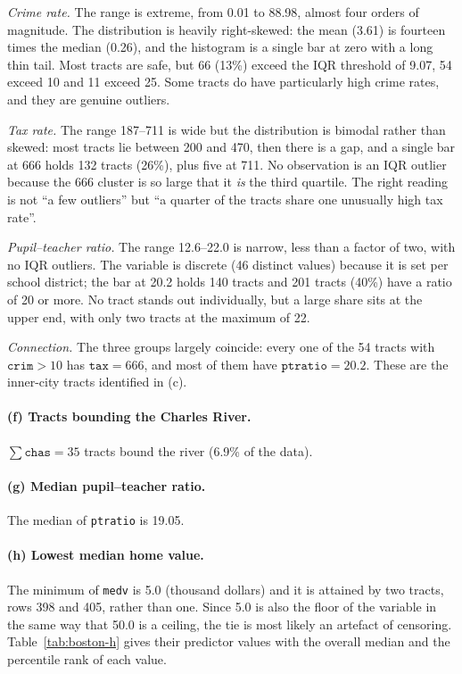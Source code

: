 \documentclass[11pt]{article}
\begin{document}
\emph{Crime rate.} The range is extreme, from 0.01 to 88.98, almost four orders of magnitude. The distribution is heavily right-skewed: the mean (3.61) is fourteen times the median (0.26), and the histogram is a single bar at zero with a long thin tail. Most tracts are safe, but 66 (13\%) exceed the IQR threshold of 9.07, 54 exceed 10 and 11 exceed 25. Some tracts do have particularly high crime rates, and they are genuine outliers.

\emph{Tax rate.} The range 187--711 is wide but the distribution is bimodal rather than skewed: most tracts lie between 200 and 470, then there is a gap, and a single bar at 666 holds 132 tracts (26\%), plus five at 711. No observation is an IQR outlier because the 666 cluster is so large that it \emph{is} the third quartile. The right reading is not ``a few outliers'' but ``a quarter of the tracts share one unusually high tax rate''.

\emph{Pupil--teacher ratio.} The range 12.6--22.0 is narrow, less than a factor of two, with no IQR outliers. The variable is discrete (46 distinct values) because it is set per school district; the bar at 20.2 holds 140 tracts and 201 tracts (40\%) have a ratio of 20 or more. No tract stands out individually, but a large share sits at the upper end, with only two tracts at the maximum of 22.

\emph{Connection.} The three groups largely coincide: every one of the 54 tracts with $\texttt{crim} > 10$ has $\texttt{tax} = 666$, and most of them have $\texttt{ptratio} = 20.2$. These are the inner-city tracts identified in (c).

\paragraph{(f) Tracts bounding the Charles River.}
$\sum \texttt{chas} = 35$ tracts bound the river (6.9\% of the data).

\paragraph{(g) Median pupil--teacher ratio.}
The median of \texttt{ptratio} is 19.05.

\paragraph{(h) Lowest median home value.}
The minimum of \texttt{medv} is 5.0 (thousand dollars) and it is attained by two tracts, rows 398 and 405, rather than one. Since 5.0 is also the floor of the variable in the same way that 50.0 is a ceiling, the tie is most likely an artefact of censoring. Table~\ref{tab:boston-h} gives their predictor values with the overall median and the percentile rank of each value.
\end{document}
